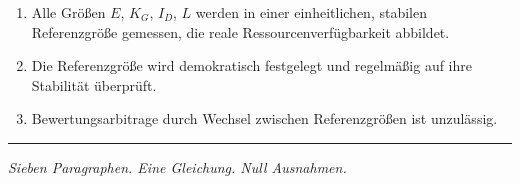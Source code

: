 \documentclass[11pt,a4paper]{article}
\begin{document}
\begin{enumerate}
  \item[(1)] Alle Größen \( E \), \( K_G \), \( I_D \), \( L \) werden in einer einheitlichen, stabilen Referenzgröße gemessen, die reale Ressourcenverfügbarkeit abbildet.
  
  \item[(2)] Die Referenzgröße wird demokratisch festgelegt und regelmäßig auf ihre Stabilität überprüft.
  
  \item[(3)] Bewertungsarbitrage durch Wechsel zwischen Referenzgrößen ist unzulässig.
\end{enumerate}

\vspace{1cm}
\hrule
\vspace{0.5cm}
\begin{center}
\textit{Sieben Paragraphen. Eine Gleichung. Null Ausnahmen.}
\end{center}
\end{document}
